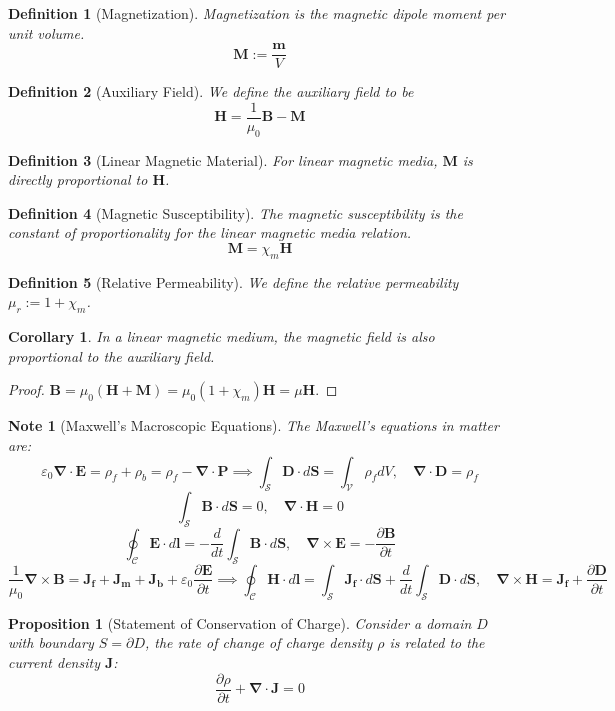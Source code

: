 \documentclass[a4paper]{article}
\newtheorem{Note}{Note}[section]
\theoremstyle{new}
\newtheorem{defi}{Definition}[section]
\newtheorem{prop}{Proposition}[section]
\newtheorem{cor}{Corollary}[section]
\begin{document}
\begin{defi}[Magnetization]
Magnetization is the magnetic dipole moment per unit volume.
$$\mathbf{M}:=\frac{\boldsymbol{m}}{V}$$
\end{defi}
\begin{defi}[Auxiliary Field]
We define the auxiliary field to be
$$\mathbf{H}=\frac{1}{\mu_0}\mathbf{B}-\mathbf{M}$$
\end{defi}
\begin{defi}[Linear Magnetic Material]
For linear magnetic media, $\mathbf{M}$ is directly proportional to $\mathbf{H}$.
\end{defi}
\begin{defi}[Magnetic Susceptibility]
The magnetic susceptibility is the constant of proportionality for the linear magnetic media relation.
$$\mathbf{M}=\chi_m\mathbf{H}$$
\end{defi}
\begin{defi}[Relative Permeability]
We define the relative permeability $\mu_r:=1+\chi_m$.
\end{defi}
\begin{cor}
In a linear magnetic medium, the magnetic field is also proportional to the auxiliary field.
\end{cor}
\begin{proof}
$\mathbf{B}=\mu_0(\mathbf{H}+\mathbf{M})=\mu_0(1+\chi_m)\mathbf{H}=\mu\mathbf{H}$.
\end{proof}
\begin{Note}[Maxwell's Macroscopic Equations]
The Maxwell's equations in matter are:
$$\varepsilon_0\boldsymbol{\nabla}\cdot\mathbf{E}=\rho_f+\rho_b=\rho_f-\boldsymbol{\nabla}\cdot\mathbf{P}\implies\int_{\mathcal{S}}\mathbf{D}\cdot d\mathbf{S}=\int_{\mathcal{V}}\rho_fdV,\quad\boldsymbol{\nabla}\cdot\mathbf{D}=\rho_f$$
$$\int_{\mathcal{S}}\mathbf{B}\cdot d\mathbf{S}=0,\quad \boldsymbol{\nabla}\cdot\mathbf{H}=0$$
$$\oint_{\mathcal{C}}\mathbf{E}\cdot d\mathbf{l}=-\frac{d}{dt}\int_{\mathcal{S}}\mathbf{B}\cdot d\mathbf{S},\quad \boldsymbol{\nabla}\times\mathbf{E}=-\frac{\partial\mathbf{B}}{\partial t}$$
$$\frac{1}{\mu_0}\boldsymbol{\nabla}\times\mathbf{B}=\mathbf{J_f}+\mathbf{J_m}+\mathbf{J_b}+\varepsilon_0\frac{\partial\mathbf{E}}{\partial t}\implies\oint_{\mathcal{C}}\mathbf{H}\cdot d\mathbf{l}=\int_{\mathcal{S}}\mathbf{J_f}\cdot d\mathbf{S}+\frac{d}{dt}\int_{\mathcal{S}}\mathbf{D}\cdot d\mathbf{S},\quad\boldsymbol{\nabla}\times\mathbf{H}=\mathbf{J_f}+\frac{\partial\mathbf{D}}{\partial t}$$
\end{Note}
\begin{prop}[Statement of Conservation of Charge]
Consider a domain $D$ with boundary $S=\partial D$, the rate of change of charge density $\rho$ is related to the current density $\mathbf{J}$:
$$\frac{\partial\rho}{\partial t}+\boldsymbol{\nabla}\cdot\mathbf{J}=0$$
\end{prop}
\end{document}
